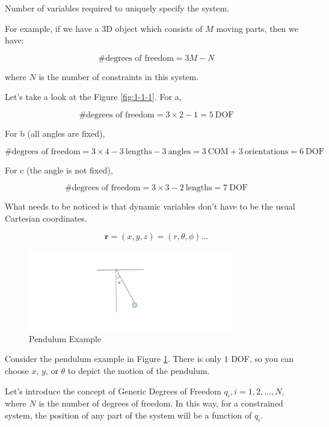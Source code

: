 \begin{definition}
    Number of variables required to uniquely specify the system.
\end{definition}

For example, if we have a 3D object which consists of $M$ moving parts, then we have:

\[
    \text{\# degrees of freedom} = 3M -N
\]

where $N$ is the number of constraints in this system.

Let's take a look at the Figure \ref{fig:1-1-1}. For a, 

\[
    \text{\# degrees of freedom} = 3 \times 2 - 1 = 5 \ \text{DOF}
\]

For b (all angles are fixed),

\[
    \text{\# degrees of freedom} = 3 \times 4 - 3 \ \text{lengths} - 3 \ \text{angles} = 3 \ \text{COM} + 3 \ \text{orientations} = 6 \ \text{DOF}
\]

For c (the angle is not fixed),

\[
    \text{\# degrees of freedom} = 3 \times 3 - 2 \ \text{lengths} = 7 \ \text{DOF}
\]

What needs to be noticed is that dynamic variables don't have to be the usual Cartesian coordinates.

\[
    \mathbf{r} = (x, y, z) = (r, \theta, \phi) ...
\]

\begin{figure}[h]
  \centering
  \includegraphics[width=0.8\textwidth]{images/1-1-2.png}
  \caption{Pendulum Example}
  \label{fig:1-1-2}
\end{figure}

Consider the pendulum example in Figure \ref{fig:1-1-2}. There is only $1$ DOF, so you can choose $x$, $y$, or $\theta$ to depict the motion of the pendulum.

Let's introduce the concept of Generic Degrees of Freedom $q_i, i=1, 2, ..., N$, where $N$ is the number of degrees of freedom. In this way, for a constrained system, the position of any part of the system will be a function of $q_i$.


